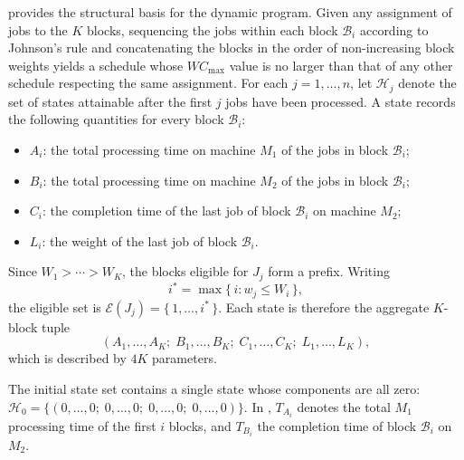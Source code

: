 \documentclass[12pt]{article}
\begin{document}
\begin{sloppypar}
         provides the structural basis for the dynamic program. Given any
        assignment of jobs to the $K$ blocks, sequencing the jobs within each block $\mathcal{B}_i$
        according to Johnson's rule and concatenating the blocks in the order of non-increasing block
        weights yields a schedule whose $W C_{\max}$ value is no larger than that of any other schedule
        respecting the same assignment.
        For each $j = 1,\dots,n$, let $\mathscr{H}_j$ denote the set of states attainable after the first
        $j$ jobs have been processed. A state records the following quantities for every block
        $\mathcal{B}_i$:
        \begin{itemize}
            \item $A_i$: the total processing time on machine $M_1$ of the jobs in block $\mathcal{B}_i$;
            \item $B_i$: the total processing time on machine $M_2$ of the jobs in block $\mathcal{B}_i$;
            \item $C_i$: the completion time of the last job of block $\mathcal{B}_i$ on machine $M_2$;
            \item $L_i$: the weight of the last job of block $\mathcal{B}_i$.
        \end{itemize}
        Since $W_1 > \cdots > W_K$, the blocks eligible for $J_j$ form a prefix. Writing
        \[
        i^* = \max\{\, i : w_j \le W_i \,\},
        \]
        the eligible set is $\mathcal{E}(J_j) = \{\, 1,\dots,i^* \,\}$.
        Each state is therefore the aggregate $K$-block tuple
        \[
        (A_1,\dots,A_K; \; B_1,\dots,B_K; \; C_1,\dots,C_K; \; L_1,\dots,L_K),
        \]
        which is described by $4K$ parameters.
        
        The initial state set contains a single state whose components are all zero:
        $\mathscr{H}_{0} = \{ (0,\dots,0; \; 0,\dots,0; \; 0,\dots,0; \; 0,\dots,0) \}$.
        In , $T_{A_i}$ denotes the total $M_1$ processing time of the first
        $i$ blocks, and $T_{B_i}$ the completion time of block $\mathcal{B}_i$ on $M_2$.
        

\end{sloppypar}
\end{document}
